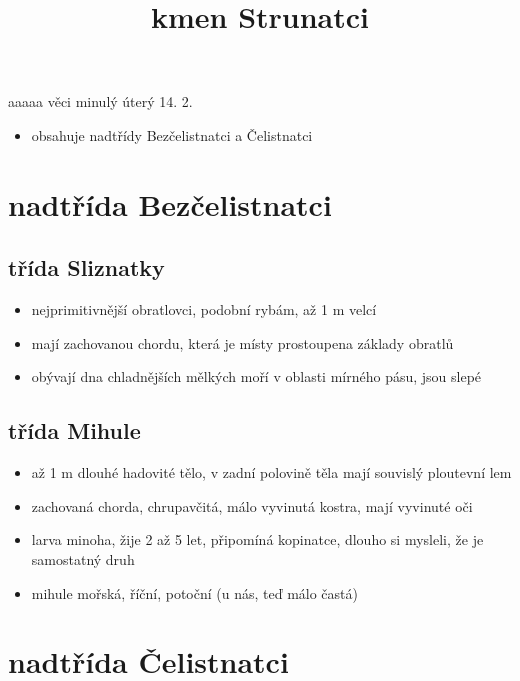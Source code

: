 \documentclass{article}
\title{\vspace{-2cm}kmen Strunatci\vspace{-1.7cm}}
\date{}
\author{}
\begin{document}
\maketitle

aaaaa věci minulý úterý 14. 2.
\begin{itemize}
  \item obsahuje nadtřídy Bezčelistnatci a Čelistnatci
\end{itemize}

\section{nadtřída Bezčelistnatci}

\subsection{třída Sliznatky}
\begin{itemize}
  \item nejprimitivnější obratlovci, podobní rybám, až 1 m velcí
  \item mají zachovanou chordu, která je místy prostoupena základy obratlů
  \item obývají dna chladnějších mělkých moří v oblasti mírného pásu, jsou slepé
\end{itemize}

\subsection{třída Mihule}
\begin{itemize}
  \item až 1 m dlouhé hadovité tělo, v zadní polovině těla mají souvislý ploutevní lem
  \item zachovaná chorda, chrupavčitá, málo vyvinutá kostra, mají vyvinuté oči
  \item larva minoha, žije 2 až 5 let, připomíná kopinatce, dlouho si mysleli, že je samostatný druh
  \item mihule mořská, říční, potoční (u nás, teď málo častá)
\end{itemize}

\section{nadtřída Čelistnatci}
\end{document}
